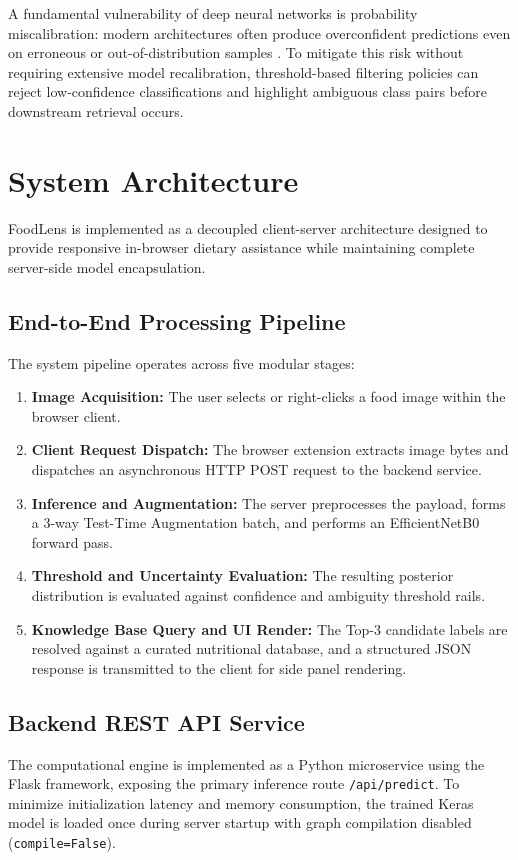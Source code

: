 \documentclass[conference]{IEEEtran}
\begin{document}
A fundamental vulnerability of deep neural networks is probability miscalibration: modern architectures often produce overconfident predictions even on erroneous or out-of-distribution samples \cite{guo2017}. To mitigate this risk without requiring extensive model recalibration, threshold-based filtering policies can reject low-confidence classifications and highlight ambiguous class pairs before downstream retrieval occurs.

\section{System Architecture}
FoodLens is implemented as a decoupled client-server architecture designed to provide responsive in-browser dietary assistance while maintaining complete server-side model encapsulation.

\subsection{End-to-End Processing Pipeline}
The system pipeline operates across five modular stages:
\begin{enumerate}
    \item \textbf{Image Acquisition:} The user selects or right-clicks a food image within the browser client.
    \item \textbf{Client Request Dispatch:} The browser extension extracts image bytes and dispatches an asynchronous HTTP POST request to the backend service.
    \item \textbf{Inference and Augmentation:} The server preprocesses the payload, forms a 3-way Test-Time Augmentation batch, and performs an EfficientNetB0 forward pass.
    \item \textbf{Threshold and Uncertainty Evaluation:} The resulting posterior distribution is evaluated against confidence and ambiguity threshold rails.
    \item \textbf{Knowledge Base Query and UI Render:} The Top-3 candidate labels are resolved against a curated nutritional database, and a structured JSON response is transmitted to the client for side panel rendering.
\end{enumerate}

\subsection{Backend REST API Service}
The computational engine is implemented as a Python microservice using the Flask framework, exposing the primary inference route \texttt{/api/predict}. To minimize initialization latency and memory consumption, the trained Keras model is loaded once during server startup with graph compilation disabled (\texttt{compile=False}).
\end{document}
